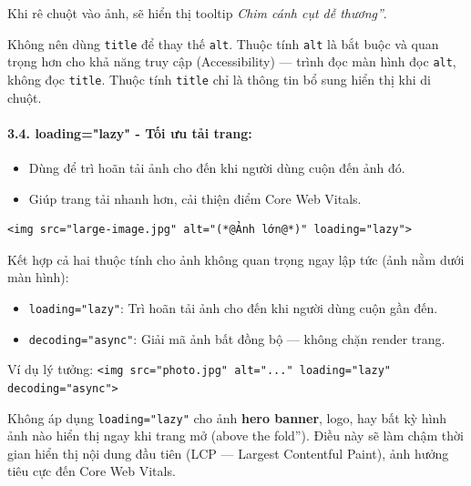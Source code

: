 \documentclass[11pt,oneside]{book}
\newcommand{\codeinline}[1]{\textcolor{accentOrange}{\texttt{#1}}}
\begin{document}
Khi rê chuột vào ảnh, sẽ hiển thị tooltip \textit{\codeinline{}Chim cánh cụt dễ thương''}.

\begin{noteBox}
Không nên dùng \codeinline{title} để thay thế \codeinline{alt}. Thuộc tính \codeinline{alt} là bắt buộc và quan trọng hơn cho khả năng truy cập (Accessibility) — trình đọc màn hình đọc \codeinline{alt}, không đọc \codeinline{title}. Thuộc tính \codeinline{title} chỉ là thông tin bổ sung hiển thị khi di chuột.
\end{noteBox}

\paragraph{3.4. loading="lazy" - Tối ưu tải trang:}
\begin{itemize}[leftmargin=1.5em, itemsep=2pt, parsep=0pt]
    \item Dùng để trì hoãn tải ảnh cho đến khi người dùng cuộn đến ảnh đó.
    \item Giúp trang tải nhanh hơn, cải thiện điểm Core Web Vitals.
\end{itemize}

\begin{codeWindow}
\begin{lstlisting}[language=HTML5]
<img src="large-image.jpg" alt="(*@Ảnh lớn@*)" loading="lazy">
\end{lstlisting}
\end{codeWindow}

\begin{tipBox}[Kết Hợp loading="lazy" Và decoding="async" Để Tối Ưu Tối Đa]
Kết hợp cả hai thuộc tính cho ảnh không quan trọng ngay lập tức (ảnh nằm dưới màn hình):
\begin{itemize}[leftmargin=1.5em, itemsep=2pt, parsep=0pt]
    \item \codeinline{loading="lazy"}: Trì hoãn tải ảnh cho đến khi người dùng cuộn gần đến.
    \item \codeinline{decoding="async"}: Giải mã ảnh bất đồng bộ — không chặn render trang.
\end{itemize}
Ví dụ lý tưởng: \codeinline{<img src="photo.jpg" alt="..." loading="lazy" decoding="async">}
\end{tipBox}

\begin{warnBox}[Không Dùng loading="lazy" Cho Ảnh Quan Trọng Đầu Trang]
Không áp dụng \codeinline{loading="lazy"} cho ảnh \textbf{hero banner}, logo, hay bất kỳ hình ảnh nào hiển thị ngay khi trang mở (\codeinline{}above the fold''). Điều này sẽ làm chậm thời gian hiển thị nội dung đầu tiên (LCP — Largest Contentful Paint), ảnh hưởng tiêu cực đến Core Web Vitals.
\end{warnBox}
\end{document}
